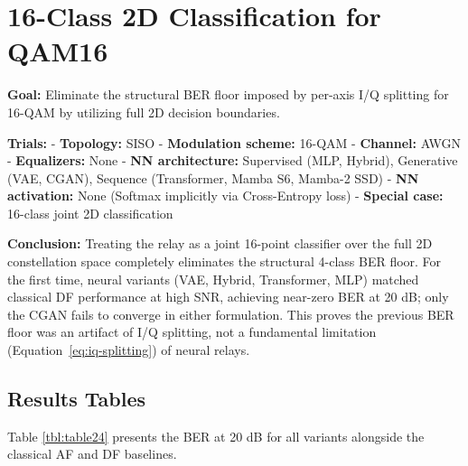 \section{16-Class 2D Classification for QAM16}\label{sec:class-2d-classification-for-qam16}

\textbf{Goal:} Eliminate the structural BER floor imposed by per-axis I/Q splitting for 16-QAM by utilizing full 2D decision boundaries.

\textbf{Trials:} - \textbf{Topology:} SISO - \textbf{Modulation scheme:} 16-QAM - \textbf{Channel:} AWGN - \textbf{Equalizers:} None - \textbf{NN architecture:} Supervised (MLP, Hybrid), Generative (VAE, CGAN), Sequence (Transformer, Mamba S6, Mamba-2 SSD) - \textbf{NN activation:} None (Softmax implicitly via Cross-Entropy loss) - \textbf{Special case:} 16-class joint 2D classification

\textbf{Conclusion:} Treating the relay as a joint 16-point classifier over the full 2D constellation space completely eliminates the structural 4-class BER floor. For the first time, neural variants (VAE, Hybrid, Transformer, MLP) matched classical DF performance at high SNR, achieving near-zero BER at 20 dB; only the CGAN fails to converge in either formulation. This proves the previous BER floor was an artifact of I/Q splitting, not a fundamental limitation (Equation~\ref{eq:iq-splitting}) of neural relays.

\subsection{Results Tables}\label{sec:results-tables-5}

Table \ref{tbl:table24} 
 presents the BER at 20 dB for all variants alongside the classical AF and DF baselines.

